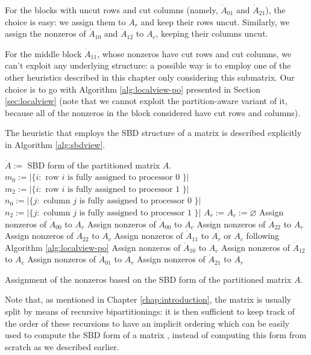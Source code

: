 For the blocks with uncut rows and cut columns (namely, $\dot{A}_{01}$ and $\dot{A}_{21}$), the choice is easy: we assign them to $A_r$ and keep their rows uncut. Similarly, we assign the nonzeros of $\dot{A}_{10}$ and $\dot{A}_{12}$ to $A_c$, keeping their columns uncut. 

For the middle block $\dot{A}_{11}$, whose nonzeros have cut rows and cut columns, we can't exploit any underlying structure: a possible way is to employ one of the other heuristics described in this chapter only considering this submatrix. Our choice is to go with Algorithm \ref{alg:localview-po} presented in Section \ref{sec:localview} (note that we cannot exploit the partition-aware variant of it, because all of the nonzeros in the block considered have cut rows and columns).

The heuristic that employs the SBD structure of a matrix is described explicitly in Algorithm \ref{alg:sbdview}.

\begin{algorithm}[h]
	\begin{algorithmic}
		\State
		\State $\dot{A}:=$ SBD form of the partitioned matrix $A$.
		\State $m_0 := |\{ i : \text{ row } i \text{ is fully assigned to processor 0 } \}|$
		\State $m_2 := |\{ i : \text{ row } i \text{ is fully assigned to processor 1 } \}|$
		\State $n_0 := |\{ j : \text{ column } j \text{ is fully assigned to processor 0 } \}|$
		\State $n_2 := |\{ j : \text{ column } j \text{ is fully assigned to processor 1 } \}|$
		\State $A_r := A_c := \varnothing$
		\State Assign nonzeros of $\dot{A}_{00}$ to $A_r$
		\Else
		\State Assign nonzeros of $\dot{A}_{00}$ to $A_c$
		\EndIf
		\State Assign nonzeros of $\dot{A}_{22}$ to $A_r$
		\Else
		\State Assign nonzeros of $\dot{A}_{22}$ to $A_c$
		\EndIf
		\State Assign nonzeros of $\dot{A}_{11}$ to $A_r$ or $A_c$ following Algorithm \ref{alg:localview-po}
		\State Assign nonzeros of $\dot{A}_{10}$ to $A_c$
		\State Assign nonzeros of $\dot{A}_{12}$ to $A_c$
		\State Assign nonzeros of $\dot{A}_{01}$ to $A_r$
		\State Assign nonzeros of $\dot{A}_{21}$ to $A_r$
	\end{algorithmic}
	\caption{Assignment of the nonzeros based on the SBD form of the partitioned matrix $A$.} \label{alg:sbdview}
\end{algorithm}

Note that, as mentioned in Chapter \ref{chap:introduction}, the matrix is usually split by means of recursive bipartitionings: it is then sufficient to keep track of the order of these recursions to have an implicit ordering which can be easily used to compute the SBD form of a matrix \cite{yzelman_cache}, instead of computing this form from scratch as we described earlier.

